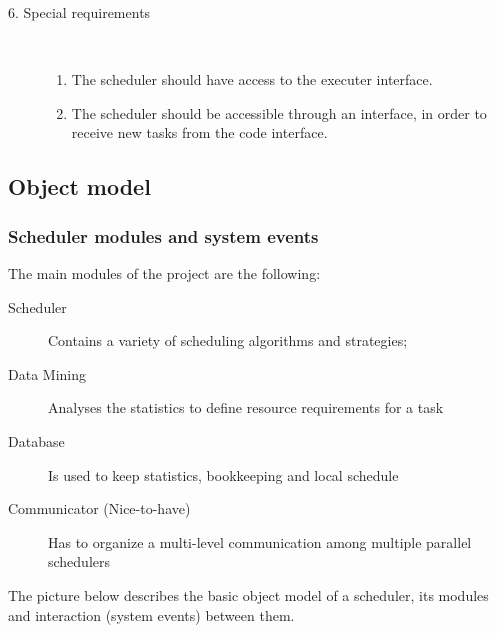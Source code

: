 \begin{description}
\item [6. Special requirements]\hfill \\
\vspace{-6.5mm}
\begin{enumerate}
\item The scheduler should have access to the executer interface.
\item The scheduler should be accessible through an interface, in order to receive new tasks from the code interface.
\end{enumerate}

\end{description}


\subsection{Object model}
\vspace{0.5cm}
\subsubsection{Scheduler modules and system events}
\vspace{0.5cm}
The main modules of the project are the following:
\begin{description}
\item[Scheduler] Contains a variety of scheduling algorithms and strategies;
\item[Data Mining] Analyses the statistics to define resource requirements for a task
\item[Database] Is used to keep statistics, bookkeeping and local schedule
\item[Communicator (Nice-to-have)] Has to organize a multi-level communication among
multiple parallel schedulers
\end{description}
\vspace{1cm}
The picture below describes the basic object model of a scheduler, its modules and interaction (system events) between them.

